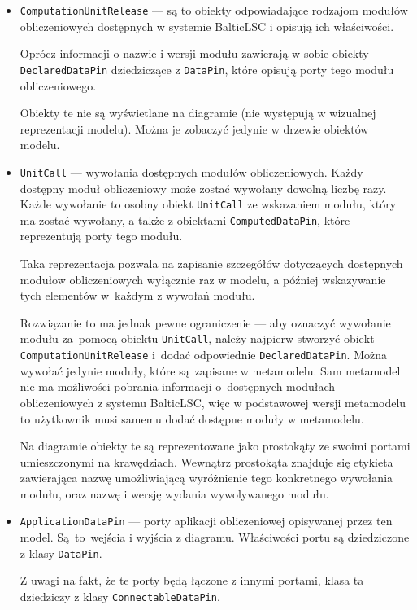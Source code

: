 \begin{itemize}
	\item \texttt{ComputationUnitRelease} --- są to obiekty odpowiadające
	      rodzajom modułów obliczeniowych dostępnych w systemie BalticLSC i opisują ich właściwości.

	      Oprócz informacji o nazwie i wersji modułu zawierają w sobie obiekty \texttt{DeclaredDataPin} dziedziczące z \texttt{DataPin}, które opisują porty tego modułu obliczeniowego.

	      Obiekty te nie są wyświetlane na diagramie (nie występują w wizualnej reprezentacji modelu). Można je zobaczyć jedynie w drzewie obiektów modelu.

	\item \texttt{UnitCall} --- wywołania dostępnych modułów
	      obliczeniowych. Każdy dostępny moduł obliczeniowy może zostać wywołany dowolną liczbę razy. Każde wywołanie to osobny obiekt \texttt{UnitCall} ze wskazaniem modułu, który ma zostać wywołany, a także z obiektami \texttt{ComputedDataPin}, które reprezentują porty tego modułu.

	      Taka reprezentacja pozwala na zapisanie szczegółów dotyczących dostępnych modułow obliczeniowych wyłącznie raz w modelu, a później wskazywanie tych elementów w~każdym z wywołań modułu.

	      Rozwiązanie to ma jednak pewne ograniczenie --- aby oznaczyć wywołanie modułu za~pomocą obiektu \texttt{UnitCall}, należy najpierw stworzyć obiekt \texttt{ComputationUnitRelease} i~dodać odpowiednie \texttt{DeclaredDataPin}. Można wywołać jedynie moduły, które są~zapisane w metamodelu. Sam metamodel nie ma możliwości pobrania informacji o~dostępnych modułach obliczeniowych z systemu BalticLSC, więc w podstawowej wersji metamodelu to użytkownik musi samemu dodać dostępne moduły w metamodelu.

	      Na diagramie obiekty te są reprezentowane jako prostokąty ze swoimi portami umieszczonymi na krawędziach. Wewnątrz prostokąta znajduje się etykieta zawierająca nazwę umożliwiającą wyróżnienie tego konkretnego wywołania modułu, oraz nazwę i wersję wydania wywolywanego modułu.

	\item \texttt{ApplicationDataPin} --- porty aplikacji obliczeniowej
	      opisywanej przez ten model. Są~to~wejścia i wyjścia z diagramu. Właściwości portu są dziedziczone z klasy \texttt{DataPin}.

	      Z uwagi na fakt, że te porty będą łączone z innymi portami, klasa ta dziedziczy z klasy \texttt{ConnectableDataPin}.


\end{itemize}
